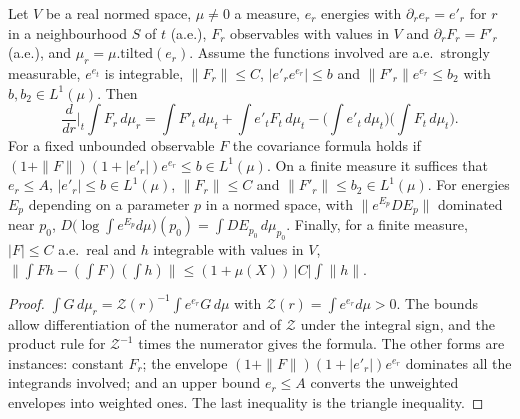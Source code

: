 \begin{lemma}\label{lem:sg-tal:vector-tilt}
\leanok
{}
Let $V$ be a real normed space, $\mu\ne0$ a measure, $e_r$ energies with $\partial_re_r=e'_r$ for $r$ in a
neighbourhood $S$ of $t$ (a.e.), $F_r$ observables with values in $V$ and $\partial_rF_r=F'_r$ (a.e.), and
$\mu_r=\mu.\mathrm{tilted}(e_r)$. Assume the functions involved are a.e.\ strongly measurable, $e^{e_t}$ is
integrable, $\|F_r\|\le C$, $|e'_re^{e_r}|\le b$ and $\|F'_r\|e^{e_r}\le b_2$ with $b,b_2\in L^1(\mu)$. Then
\[
\frac d{dr}\Big|_{t}\int F_r\,d\mu_r=\int F'_t\,d\mu_t
 +\int e'_tF_t\,d\mu_t-\Big(\int e'_t\,d\mu_t\Big)\Big(\int F_t\,d\mu_t\Big).
\]
For a fixed unbounded observable $F$ the covariance formula holds if
$(1+\|F\|)(1+|e'_r|)e^{e_r}\le b\in L^1(\mu)$. On a finite measure it suffices that $e_r\le A$,
$|e'_r|\le b\in L^1(\mu)$, $\|F_r\|\le C$ and $\|F'_r\|\le b_2\in L^1(\mu)$. For energies $E_p$ depending on a
parameter $p$ in a normed space, with $\|e^{E_p}DE_p\|$ dominated near $p_0$,
$D\bigl(\log\int e^{E_p}d\mu\bigr)(p_0)=\int DE_{p_0}\,d\mu_{p_0}$. Finally, for a finite measure, $|F|\le C$
a.e.\ real and $h$ integrable with values in $V$,
$\|\int Fh-(\int F)(\int h)\|\le(1+\mu(X))\,|C|\int\|h\|$.
\end{lemma}
\begin{proof}
\leanok
$\int G\,d\mu_r=\mathcal Z(r)^{-1}\int e^{e_r}G\,d\mu$ with $\mathcal Z(r)=\int e^{e_r}d\mu>0$. The bounds allow
differentiation of the numerator and of $\mathcal Z$ under the integral sign, and the product rule for
$\mathcal Z^{-1}$ times the numerator gives the formula. The other forms are instances: constant $F_r$; the envelope
$(1+\|F\|)(1+|e'_r|)e^{e_r}$ dominates all the integrands involved; and an upper bound $e_r\le A$ converts the
unweighted envelopes into weighted ones. The last inequality is the triangle inequality.
\end{proof}

